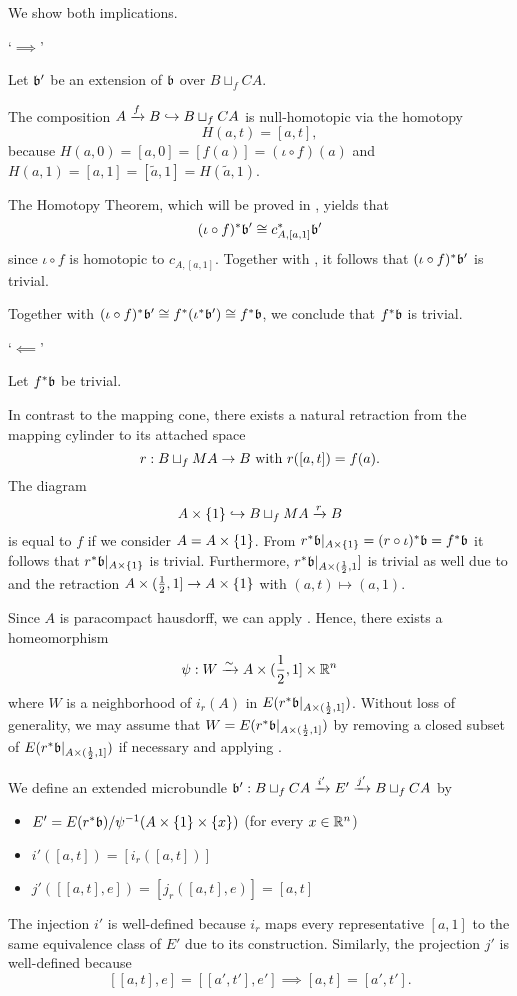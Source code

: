 \begin{myproof} We show both implications.

`$\implies$'

Let $\bb'$ be an extension of $\bb$ over $B \sqcup_f CA$.

The composition $A \xrightarrow{f} B \hookrightarrow{} B \sqcup_f CA$ is null-homotopic via the homotopy \[ H(a, t) = [a, t], \] because $H(a, 0) = [a, 0] = [f(a)] = (\iota \circ f)(a)$ and $H(a, 1) = [a, 1] = [\tilde{a}, 1] = H(\tilde{a}, 1)$.

The Homotopy Theorem, which will be proved in , yields that \[ \ind{(\iota \circ f)}\bb' \cong \ind{c_{A, [a, 1]}}\bb' \] since $\iota \circ f$ is homotopic to $c_{A, [a, 1]}$. Together with , it follows that $\ind{(\iota \circ f)}\bb'$ is trivial.

Together with $\ind{(\iota \circ f)}\bb' \cong \ind{f}(\ind{\iota}\bb') \cong \ind{f}\bb$, we conclude that $\ind{f}\bb$ is trivial.

`$\impliedby$'

Let $\ind{f}\bb$ be trivial.

In contrast to the mapping cone, there exists a natural retraction from the mapping cylinder to its attached space \[ r: B \sqcup_f MA \to B \text{ with } r([a, t]) = f(a). \] The diagram \[ A \times \{1\} \hookrightarrow{} B \sqcup_f MA \xrightarrow{r} B \] is equal to $f$ if we consider $A = A \times{} \{1\}$. From $\ind{r}\bb[A \cross \{1\}] = \ind{(r \circ \iota)}\bb = \ind{f}\bb$ it follows that $\ind{r}\bb[A \cross \{1\}]$ is trivial. Furthermore, $\ind{r}\bb[A \cross (\half, 1]]$ is trivial as well due to  and the retraction $A \times (\frac{1}{2}, 1] \to A \times{} \{1\}$ with $(a, t) \mapsto (a, 1)$.

Since $A$ is paracompact hausdorff, we can apply . Hence, there exists a homeomorphism \[ \psi: W \xrightarrow{\sim} A \times (\frac{1}{2}, 1] \times \mathbb{R}^n \] where $W$ is a neighborhood of $i_r(A)$ in $E(\ind{r}\bb[A \cross {(\half, 1]}])$. Without loss of generality, we may assume that $W = E(\ind{r}\bb[A \cross {(\half, 1]}])$ by removing a closed subset of $E(\ind{r}\bb[A \cross {(\half, 1]}])$ if necessary and applying .

We define an extended microbundle $\bundledef{\bb'}{B \sqcup_f CA}{E'}{i'}{j'}$ by \begin{itemize} \item $E' = E(\ind{r}\bb) / \inv{\psi}(A \cross \{1\} \cross \{x\})$ (for every $x \in \mathbb{R}^n$) \item $i'([a, t]) = [i_r([a, t])]$ \item $j'([[a, t], e]) = [j_r([a, t], e)] = [a, t]$ \end{itemize} The injection $i'$ is well-defined because $i_r$ maps every representative $[a, 1]$ to the same equivalence class of $E'$ due to its construction. Similarly, the projection $j'$ is well-defined because \[ [[a, t], e] = [[a', t'], e'] \implies [a, t] = [a', t']. \]


\end{myproof}
